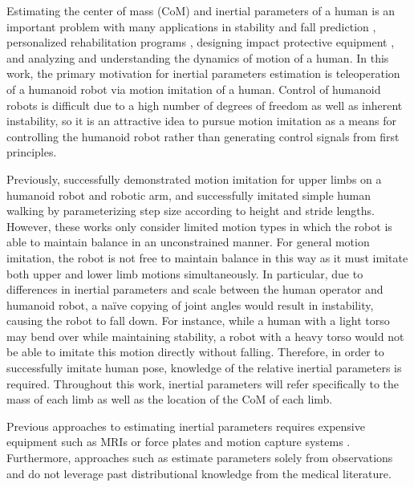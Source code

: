 \label{intro}
Estimating the center of mass (CoM) and inertial parameters of a human is an important problem with many applications in stability and fall prediction \cite{stone2013unobtrusive,dutta2013low}, personalized rehabilitation programs \cite{venture2008motion}, designing impact protective equipment \cite{armstrong1988anthropometry,chandler1975investigation}, and analyzing and understanding the dynamics of motion of a human. 
In this work, the primary motivation for inertial parameters estimation is teleoperation of a humanoid robot via motion imitation of a human. Control of humanoid robots is difficult due to a high number of degrees of freedom as well as inherent instability,
so it is an attractive idea to pursue motion imitation as a means for controlling the humanoid robot rather than generating control signals from first principles.%

Previously, \cite{miller2004motion,ishiguro2005development} successfully demonstrated motion imitation for upper limbs on a humanoid robot and robotic arm, and \cite{kim2010online,hong2009walking} successfully imitated simple human walking by parameterizing step size according to height and stride lengths.
However, these works only consider limited motion types in which the robot is able to maintain balance in an unconstrained manner. 
For general motion imitation, the robot is not free to maintain balance in this way as it must imitate both upper and lower limb motions simultaneously. 
In particular, due to differences in inertial parameters and scale between the human operator and humanoid robot, a na\"ive copying of joint angles would result in instability, causing the robot to fall down.
For instance, while a human with a light torso may bend over while maintaining stability, a robot with a heavy torso would not be able to imitate this motion directly without falling.
Therefore, in order to successfully imitate human pose, knowledge of the relative inertial parameters is required. 
Throughout this work, inertial parameters will refer specifically to the mass of each limb as well as the location of the CoM of each limb. 

Previous approaches to estimating inertial parameters requires expensive equipment such as MRIs \cite{cheng2000segment} or force plates and motion capture systems \cite{venture2008motion}. Furthermore, approaches such as \cite{venture2008motion,gonzalez2012estimation} estimate parameters solely from observations and do not leverage past distributional knowledge from the medical literature. 

